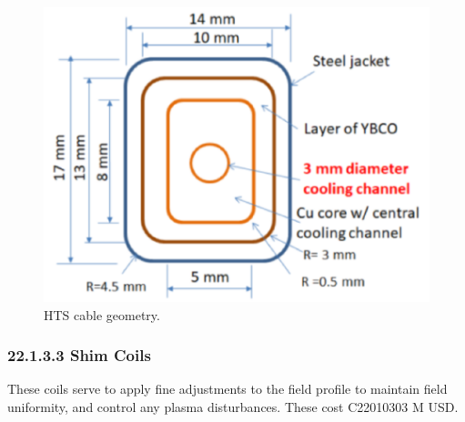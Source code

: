 \begin{figure}[h]
    \centering
    \includegraphics[width =0.5\linewidth]{StandardFigures/yuhu_cs.pdf}
    \caption{HTS cable geometry.}
    \label{fig:yuhu_cs}
\end{figure}

\subsubsection*{22.1.3.3 Shim Coils}

These coils serve to apply fine adjustments to the field profile to maintain field uniformity, and control any plasma disturbances. These cost C22010303 M USD.\\

